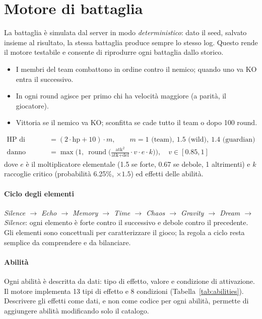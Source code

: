 \documentclass[11pt,a4paper]{report}
\begin{document}
\section{Motore di battaglia}
\label{sec:battle}

La battaglia è simulata dal server in modo \emph{deterministico}: dato il seed, salvato insieme al risultato, la stessa battaglia produce sempre lo stesso log. Questo rende il motore testabile e consente di riprodurre ogni battaglia dallo storico.

\begin{itemize}
  \item I membri del team combattono in ordine contro il nemico; quando uno va KO entra il successivo.
  \item In ogni round agisce per primo chi ha velocità maggiore (a parità, il giocatore).
  \item Vittoria se il nemico va KO; sconfitta se cade tutto il team o dopo 100 round.
\end{itemize}

\begin{align*}
\text{HP di battaglia} &= (2\cdot\text{hp} + 10)\cdot m, \qquad m = 1 \text{ (team)},\ 1.5 \text{ (wild)},\ 1.4 \text{ (guardian)}\\
\text{danno} &= \max\!\Big(1,\ \operatorname{round}\Big(\frac{\text{atk}^2}{\text{atk}+\text{def}}\cdot v \cdot e \cdot k\Big)\Big), \quad v \in [0.85, 1]
\end{align*}
dove $e$ è il moltiplicatore elementale (1.5 se forte, 0.67 se debole, 1 altrimenti) e $k$ raccoglie critico (probabilità 6.25\%, $\times 1.5$) ed effetti delle abilità.

\paragraph{Ciclo degli elementi}
\textit{Silence $\rightarrow$ Echo $\rightarrow$ Memory $\rightarrow$ Time $\rightarrow$ Chaos $\rightarrow$ Gravity $\rightarrow$ Dream $\rightarrow$ Silence}: ogni elemento è forte contro il successivo e debole contro il precedente. Gli elementi sono concettuali per caratterizzare il gioco; la regola a ciclo resta semplice da comprendere e da bilanciare.

\paragraph{Abilità}
Ogni abilità è descritta da dati: tipo di effetto, valore e condizione di attivazione. Il motore implementa 13 tipi di effetto e 8 condizioni (Tabella~\ref{tab:abilities}). Descrivere gli effetti come dati, e non come codice per ogni abilità, permette di aggiungere abilità modificando solo il catalogo.
\end{document}
